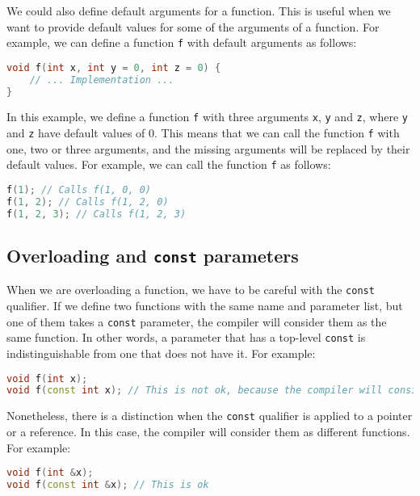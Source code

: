 We could also define default arguments for a function. This is useful when we want to
provide default values for some of the arguments of a function. For example, we can
define a function \texttt{f} with default arguments as follows:\\

\begin{lstlisting}[language=C++]
void f(int x, int y = 0, int z = 0) {
    // ... Implementation ...
}
\end{lstlisting}

In this example, we define a function \texttt{f} with three arguments \texttt{x}, \texttt{y}
and \texttt{z}, where \texttt{y} and \texttt{z} have default values of 0. This means that
we can call the function \texttt{f} with one, two or three arguments, and the missing
arguments will be replaced by their default values. For example, we can call the function
\texttt{f} as follows:\\

\begin{lstlisting}[language=C++]
f(1); // Calls f(1, 0, 0)
f(1, 2); // Calls f(1, 2, 0)
f(1, 2, 3); // Calls f(1, 2, 3)
\end{lstlisting}

\subsection{Overloading and \texttt{const} parameters}

When we are overloading a function, we have to be careful with the \texttt{const}
qualifier. If we define two functions with the same name and parameter list, but
one of them takes a \texttt{const} parameter, the compiler will consider them as
the same function. In other words, a parameter that has a top-level \texttt{const}
is indistinguishable from one that does not have it. For example:\\

\begin{lstlisting}[language=C++]
void f(int x);
void f(const int x); // This is not ok, because the compiler will consider them as the same function
\end{lstlisting}

Nonetheless, there is a distinction when the \texttt{const} qualifier is applied to
a pointer or a reference. In this case, the compiler will consider them as different
functions. For example:\\

\begin{lstlisting}[language=C++]
void f(int &x);
void f(const int &x); // This is ok
\end{lstlisting}

